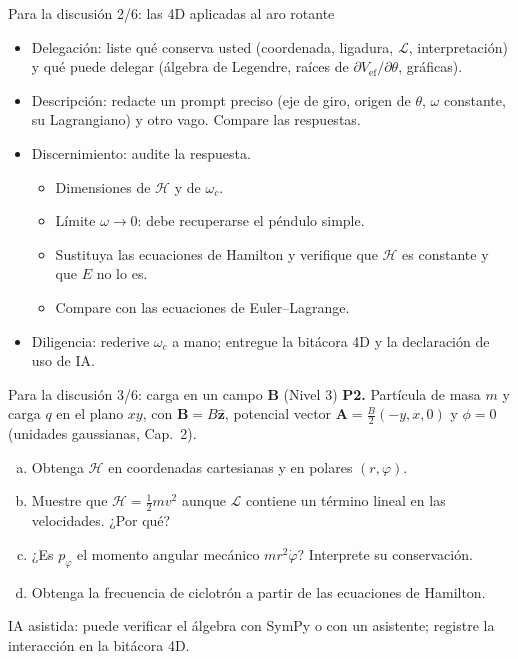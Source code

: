 \documentclass[spanish]{beamer}
\newcommand{\Lag}{\mathcal{L}}               %
\newcommand{\Ham}{\mathcal{H}}               %
\begin{document}
\begin{frame}{Para la discusión 2/6: las 4D aplicadas al aro rotante}
\begin{itemize}[<+->]
  \item \alert{Delegación:} liste qué conserva usted (coordenada, ligadura, $\Lag$,
        interpretación) y qué puede delegar (álgebra de Legendre, raíces de
        $\partial V_{\mathrm{ef}}/\partial\theta$, gráficas).
  \item \alert{Descripción:} redacte un prompt preciso (eje de giro, origen de $\theta$,
        $\omega$ constante, su Lagrangiano) y otro vago. Compare las respuestas.
  \item \alert{Discernimiento:} audite la respuesta.
        \begin{itemize}
          \item Dimensiones de $\Ham$ y de $\omega_c$.
          \item Límite $\omega\to0$: debe recuperarse el péndulo simple.
          \item Sustituya las ecuaciones de Hamilton y verifique que $\Ham$ es constante
                y que $E$ no lo es.
          \item Compare con las ecuaciones de Euler--Lagrange.
        \end{itemize}
  \item \alert{Diligencia:} rederive $\omega_c$ a mano; entregue la bitácora 4D y la
        declaración de uso de IA.
\end{itemize}
\end{frame}

\begin{frame}{Para la discusión 3/6: carga en un campo $\mathbf B$ (Nivel 3)}
\textbf{P2.} Partícula de masa $m$ y carga $q$ en el plano $xy$, con
$\mathbf B=B\hat{\mathbf z}$, potencial vector $\mathbf A=\frac B2(-y,x,0)$ y $\phi=0$
(unidades gaussianas, Cap.~2).
\begin{enumerate}[(a)]
  \item Obtenga $\Ham$ en coordenadas cartesianas y en polares $(r,\varphi)$.
  \item Muestre que $\Ham=\tfrac12 mv^2$ aunque $\Lag$ contiene un término lineal en
        las velocidades. ¿Por qué?
  \item ¿Es $p_\varphi$ el momento angular mecánico $mr^2\dot\varphi$? Interprete su conservación.
  \item Obtenga la frecuencia de ciclotrón a partir de las ecuaciones de Hamilton.
\end{enumerate}
\medskip
{\small IA asistida: puede verificar el álgebra con SymPy o con un asistente;
registre la interacción en la bitácora 4D.}
\end{frame}
\end{document}
